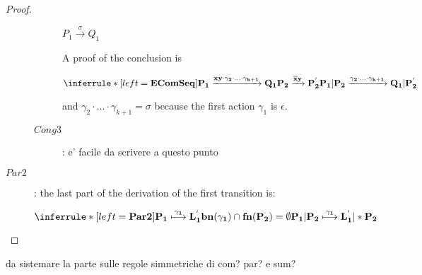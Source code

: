 \begin{proposition}
\begin{proof}
\begin{description}
\begin{description}
		    \begin{center}
		      $P_{1} \xrightarrow{\sigma} Q_{1}$ 
		    \end{center}
		    A proof of the conclusion is
		    \begin{center}
		      $\inferrule* [left=\bf{EComSeq}]{
			  P_{1} \xrightarrow{xy \cdot \gamma_{2}\cdot \ldots \cdot \gamma_{k+1}} Q_{1}
			\\
			  P_{2}\xrightarrow{\overline{x}y} P_{2}^{'}
		      }{
			P_{1}|P_{2} \xrightarrow{\gamma_{2}\cdot \ldots \cdot \gamma_{k+1}} Q_{1}|P_{2}^{'}
		      }$ 
		    \end{center}
		    and $\gamma_{2}\cdot \ldots \cdot \gamma_{k+1}=\sigma$ because the first action $\gamma_{1}$ is $\epsilon$.
		  \item[$Cong3$]: e' facile da scrivere a questo punto
		    
		\end{description}
	      \item[$Par2$]: 
		the last part of the derivation of the first transition is:
		\begin{center}
		  $\inferrule* [left=\bf{Par2}]{
		      P_{1} \stackrel{\gamma_{1}}{\longmapsto} L_{1}^{'}
		    \\
		      bn(\gamma_{1})\cap fn(P_{2})=\emptyset
		  }{
		    P_{1}|P_{2} \stackrel{\gamma_{1}}{\longmapsto} L_{1}^{'}|*P_{2}
		  }$ 		      
		\end{center}
	    \end{description}	    
  \end{proof}
\end{proposition}


da sistemare la parte sulle regole simmetriche di com? par? e sum?



